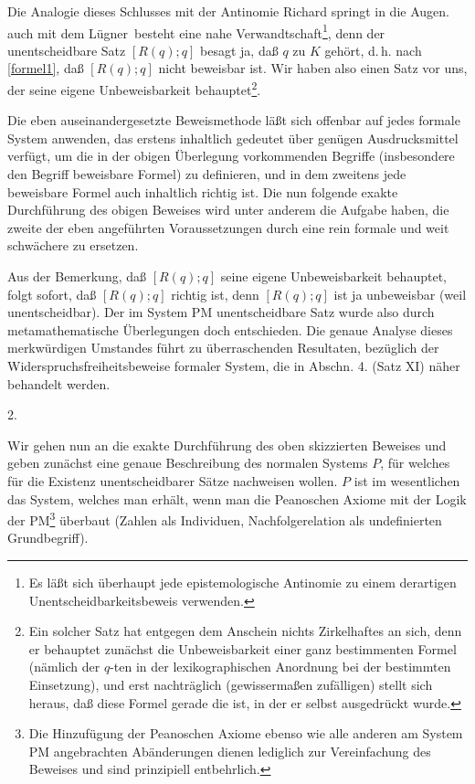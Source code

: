 \documentclass{scrartcl}
\begin{document}
Die Analogie dieses Schlusses mit der Antinomie Richard
springt in die Augen. auch mit dem 
\glqq Lügner\grqq\ besteht eine nahe 
Verwandtschaft\footnote{Es läßt sich überhaupt jede epistemologische 
Antinomie zu einem derartigen Unentscheidbarkeitsbeweis verwenden.},
denn der unentscheidbare Satz $[R(q); q]$ besagt ja,
daß $q$ zu $K$ gehört, d.\,h. nach \ref{formel1},
daß $[R(q); q]$ nicht beweisbar ist. Wir haben
also einen Satz vor uns, der seine eigene
Unbeweisbarkeit behauptet\footnote{Ein solcher Satz 
hat entgegen dem Anschein nichts Zirkelhaftes an sich, denn 
er behauptet zunächst die Unbeweisbarkeit einer ganz bestimmenten 
Formel (nämlich der $q$-ten in der lexikographischen Anordnung
bei der bestimmten Einsetzung), und erst nachträglich (gewissermaßen
zufälligen) stellt sich heraus, daß diese Formel gerade
die ist, in der er selbst ausgedrückt wurde.}.

Die eben auseinandergesetzte Beweismethode läßt sich 
offenbar auf jedes formale System anwenden, das erstens 
inhaltlich gedeutet über genügen Ausdrucksmittel
verfügt, um die in der obigen Überlegung vorkommenden
Begriffe (insbesondere den Begriff \glqq beweisbare
Formel\grqq) zu definieren, und in dem zweitens jede
beweisbare Formel auch inhaltlich richtig ist. Die
nun folgende exakte Durchführung des obigen Beweises
wird unter anderem die Aufgabe haben, die zweite der eben
angeführten Voraussetzungen durch eine rein formale und 
weit schwächere zu ersetzen.

Aus der Bemerkung, daß $[R(q); q]$ seine eigene 
Unbeweisbarkeit behauptet, folgt sofort, daß $[R(q); q]$ 
richtig ist, denn $[R(q); q]$ ist ja unbeweisbar (weil 
unentscheidbar). Der im System PM unentscheidbare Satz 
wurde also durch metamathematische Überlegungen doch
entschieden. Die genaue Analyse dieses merkwürdigen 
Umstandes führt zu überraschenden Resultaten, bezüglich der
Widerspruchsfreiheitsbeweise formaler System, die in 
Abschn. 4. (Satz XI) näher behandelt werden.

\begin{center}
2.
\end{center}

Wir gehen nun an die exakte Durchführung des
oben skizzierten Beweises und geben zunächst eine
genaue Beschreibung des normalen Systems $P$, für welches
für die Existenz unentscheidbarer Sätze nachweisen wollen. 
$P$ ist im wesentlichen das System, welches man erhält, 
wenn man die Peanoschen Axiome mit der Logik
der PM\footnote{Die Hinzufügung der Peanoschen 
Axiome ebenso wie alle anderen am System PM angebrachten 
Abänderungen dienen lediglich zur Vereinfachung des 
Beweises und sind prinzipiell entbehrlich.}
überbaut (Zahlen als Individuen, Nachfolgerelation
als undefinierten Grundbegriff).
\end{document}
